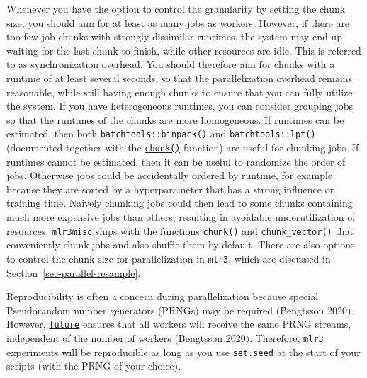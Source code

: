 Whenever you have the option to control the granularity by setting the
chunk size, you should aim for at least as many jobs as workers.
However, if there are too few job chunks with strongly dissimilar
runtimes, the system may end up waiting for the last chunk to finish,
while other resources are idle. This is referred to as synchronization
overhead. You should therefore aim for chunks with a
runtime of at least several seconds, so that the parallelization
overhead remains reasonable, while still having enough chunks to ensure
that you can fully utilize the system. If you have heterogeneous
runtimes, you can consider grouping jobs so that the runtimes of the
chunks are more homogeneous. If runtimes can be estimated, then both
\texttt{batchtools::binpack()} and \texttt{batchtools::lpt()}
(documented together with the
\href{https://www.rdocumentation.org/packages/batchtools/topics/chunk}{\texttt{chunk()}}
function) are useful for chunking jobs. If runtimes cannot be estimated,
then it can be useful to randomize the order of jobs. Otherwise jobs
could be accidentally ordered by runtime, for example because they are
sorted by a hyperparameter that has a strong influence on training time.
Naively chunking jobs could then lead to some chunks containing much
more expensive jobs than others, resulting in avoidable underutilization
of resources.
\href{https://mlr3misc.mlr-org.com}{\texttt{mlr3misc}}
ships with the functions
\href{https://mlr3misc.mlr-org.com/reference/chunk.html}{\texttt{chunk()}}
and
\href{https://mlr3misc.mlr-org.com/reference/chunk_vector.html}{\texttt{chunk\_vector()}}
that conveniently chunk jobs and also shuffle them by default. There are
also options to control the chunk size for parallelization in
\texttt{mlr3}, which are discussed in
Section~\ref{sec-parallel-resample}.

\begin{tcolorbox}[enhanced jigsaw, opacitybacktitle=0.6, rightrule=.15mm, opacityback=0, arc=.35mm, breakable, titlerule=0mm, colframe=quarto-callout-tip-color-frame, coltitle=black, bottomrule=.15mm, toprule=.15mm, colback=white, colbacktitle=quarto-callout-tip-color!10!white, bottomtitle=1mm, toptitle=1mm, title=\textcolor{quarto-callout-tip-color}{\faLightbulb}\hspace{0.5em}{Reproducibility}, leftrule=.75mm, left=2mm]

Reproducibility is often a concern during parallelization because
special Pseudorandom number generators (PRNGs) may be required
(Bengtsson 2020). However,
\href{https://cran.r-project.org/package=future}{\texttt{future}}
ensures that all workers will receive the same PRNG streams, independent
of the number of workers (Bengtsson 2020). Therefore, \texttt{mlr3}
experiments will be reproducible as long as you use \texttt{set.seed} at
the start of your scripts (with the PRNG of your choice).

\end{tcolorbox}

